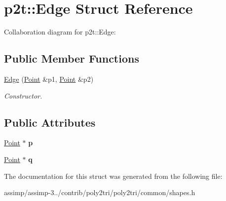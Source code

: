 \hypertarget{structp2t_1_1_edge}{\section{p2t\+:\+:Edge Struct Reference}
\label{structp2t_1_1_edge}
}


Collaboration diagram for p2t\+:\+:Edge\+:
\subsection*{Public Member Functions}
\begin{DoxyCompactItemize}
\item 
\hypertarget{structp2t_1_1_edge_af5d8d51f97093c617c61a2a8618ec046}{\hyperlink{structp2t_1_1_edge_af5d8d51f97093c617c61a2a8618ec046}{Edge} (\hyperlink{structp2t_1_1_point}{Point} \&p1, \hyperlink{structp2t_1_1_point}{Point} \&p2)}\label{structp2t_1_1_edge_af5d8d51f97093c617c61a2a8618ec046}

\begin{DoxyCompactList}\small\item\em Constructor. \end{DoxyCompactList}\end{DoxyCompactItemize}
\subsection*{Public Attributes}
\begin{DoxyCompactItemize}
\item 
\hypertarget{structp2t_1_1_edge_a5d0fe19975fb3ef1cd40df5e20afb302}{\hyperlink{structp2t_1_1_point}{Point} $\ast$ {\bfseries p}}\label{structp2t_1_1_edge_a5d0fe19975fb3ef1cd40df5e20afb302}

\item 
\hypertarget{structp2t_1_1_edge_ae20ac7e995e83330fcc23b3235dcdeda}{\hyperlink{structp2t_1_1_point}{Point} $\ast$ {\bfseries q}}\label{structp2t_1_1_edge_ae20ac7e995e83330fcc23b3235dcdeda}

\end{DoxyCompactItemize}


The documentation for this struct was generated from the following file\+:\begin{DoxyCompactItemize}
\item 
assimp/assimp-\/3../contrib/poly2tri/poly2tri/common/shapes.\+h\end{DoxyCompactItemize}
